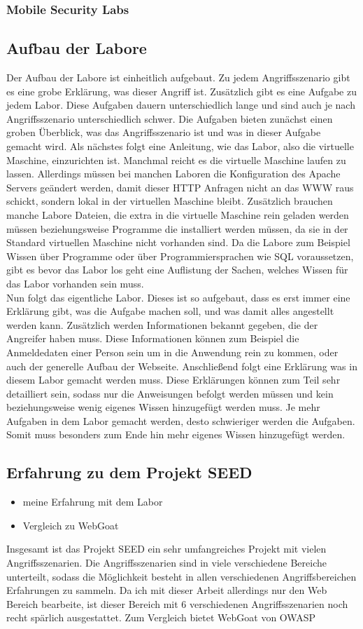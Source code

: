 \subsubsection{Mobile Security Labs}
\subsection{Aufbau der Labore}
Der Aufbau der Labore ist einheitlich aufgebaut. Zu jedem Angriffsszenario gibt es eine grobe Erklärung, was dieser Angriff ist. Zusätzlich gibt es eine Aufgabe zu jedem Labor. Diese Aufgaben dauern unterschiedlich lange und sind auch je nach Angriffsszenario unterschiedlich schwer. Die Aufgaben bieten zunächst einen groben Überblick, was das Angriffsszenario ist und was in dieser Aufgabe gemacht wird. Als nächstes folgt eine Anleitung, wie das Labor, also die virtuelle Maschine, einzurichten ist. Manchmal reicht es die virtuelle Maschine laufen zu lassen. Allerdings müssen bei manchen Laboren die Konfiguration des Apache Servers geändert werden, damit dieser HTTP Anfragen nicht an das WWW raus schickt, sondern lokal in der virtuellen Maschine bleibt. Zusätzlich brauchen manche Labore Dateien, die extra in die virtuelle Maschine rein geladen werden müssen beziehungsweise Programme die installiert werden müssen, da sie in der Standard virtuellen Maschine nicht vorhanden sind. Da die Labore zum Beispiel Wissen über Programme oder über Programmiersprachen wie SQL voraussetzen, gibt es bevor das Labor los geht eine Auflistung der Sachen, welches Wissen für das Labor vorhanden sein muss. \\
Nun folgt das eigentliche Labor. Dieses ist so aufgebaut, dass es erst immer eine Erklärung gibt, was die Aufgabe machen soll, und was damit alles angestellt werden kann. Zusätzlich werden Informationen bekannt gegeben, die der Angreifer haben muss. Diese Informationen können zum Beispiel die Anmeldedaten einer Person sein um in die Anwendung rein zu kommen, oder auch der generelle Aufbau der Webseite. Anschließend folgt eine Erklärung was in diesem Labor gemacht werden muss. Diese Erklärungen können zum Teil sehr detailliert sein, sodass nur die Anweisungen befolgt werden müssen und kein beziehungsweise wenig eigenes Wissen hinzugefügt werden muss. Je mehr Aufgaben in dem Labor gemacht werden, desto schwieriger werden die Aufgaben. Somit muss besonders zum Ende hin mehr eigenes Wissen hinzugefügt werden. 
\subsection{Erfahrung zu dem Projekt SEED}
\begin{itemize}
	\item meine Erfahrung mit dem Labor
	\item Vergleich zu WebGoat
\end{itemize}
Insgesamt ist das Projekt SEED ein sehr umfangreiches Projekt mit vielen Angriffsszenarien. Die Angriffsszenarien sind in viele verschiedene Bereiche unterteilt, sodass die Möglichkeit besteht in allen verschiedenen Angriffsbereichen Erfahrungen zu sammeln. Da ich mit dieser Arbeit allerdings nur den Web Bereich bearbeite, ist dieser Bereich mit 6 verschiedenen Angriffsszenarien noch recht spärlich ausgestattet. Zum Vergleich bietet WebGoat von OWASP 